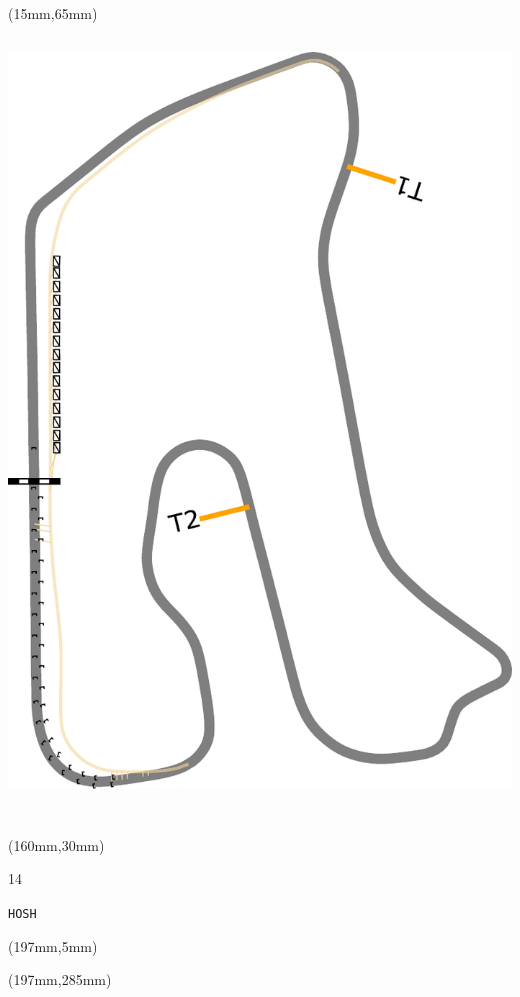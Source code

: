\begin{textblock*}{185mm}(15mm,65mm)%
\centering
\mbox{\includegraphics[width=185mm,height=210mm,keepaspectratio]{PT/HOSH.pdf}}
\end{textblock*}
\begin{textblock*}{40mm}(160mm,30mm)%
\Large
\par{} 
\par14 
\par\hfill\tiny\tt HOSH\\
\end{textblock*}
\begin{textblock*}{20mm}(197mm,5mm)%
\fbox{\thepage}
\label{HOSH}
\end{textblock*}
\begin{textblock*}{20mm}(197mm,285mm)%
\fbox{\thepage}
\end{textblock*}

